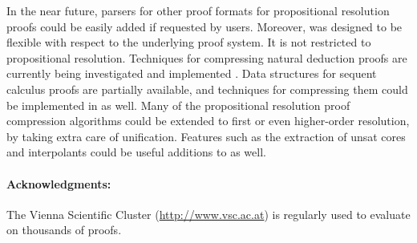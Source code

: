 \documentclass{llncs}
\begin{document}
In the near future, parsers for other proof formats for propositional resolution proofs could be easily added if requested by users. Moreover, {\skeptik} was designed to be flexible with respect to the underlying proof system. It is not restricted to propositional resolution. Techniques for compressing natural deduction proofs are currently being investigated and implemented \cite{ContextualND}.
Data structures for sequent calculus proofs are partially available, and techniques for compressing them \cite{CutIntro} 
could be implemented in {\skeptik} as well. Many of the propositional resolution proof compression algorithms could be extended to first or even higher-order resolution, by taking extra care of unification. Features such as the extraction of unsat cores and interpolants could be useful additions to {\skeptik} as well.

\vspace{-5pt}

\paragraph{Acknowledgments: } The Vienna Scientific Cluster (\url{http://www.vsc.ac.at}) is regularly used to evaluate {\skeptik} on thousands of proofs.




\end{document}
